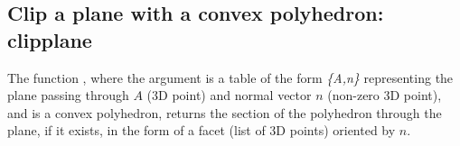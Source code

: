 \subsection{Clip a plane with a convex polyhedron: clipplane}

The function , where the argument  is a table of the form \emph{\{A,n\}} representing the plane passing through $A$ (3D point) and normal vector $n$ (non-zero 3D point), and  is a convex polyhedron, returns the section of the polyhedron through the plane, if it exists, in the form of a facet (list of 3D points) oriented by $n$.
